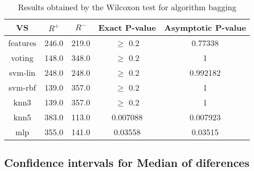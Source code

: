 \documentclass[a4paper,10pt]{article}
\begin{document}
\begin{table}[!htp]
\centering\small
\begin{tabular}{
|c|c|c|c|c|}
\hline
 VS & $R^{+}$ & $R^{-}$ & Exact P-value & Asymptotic P-value \\ \hline 
features & 246.0 & 219.0 & $\geq$ 0.2 & 0.77338\\ \hline 
voting & 148.0 & 348.0 & $\geq$ 0.2 & 1\\ \hline 
svm-lin & 248.0 & 248.0 & $\geq$ 0.2 & 0.992182\\ \hline 
svm-rbf & 139.0 & 357.0 & $\geq$ 0.2 & 1\\ \hline 
knn3 & 139.0 & 357.0 & $\geq$ 0.2 & 1\\ \hline 
knn5 & 383.0 & 113.0 & 0.007088 & 0.007923\\ \hline 
mlp & 355.0 & 141.0 & 0.03558 & 0.03515\\ \hline 

\end{tabular}
\caption{Results obtained by the Wilcoxon test for algorithm bagging}
\end{table}

\subsection{Confidence intervals for Median of diferences}
\end{document}
